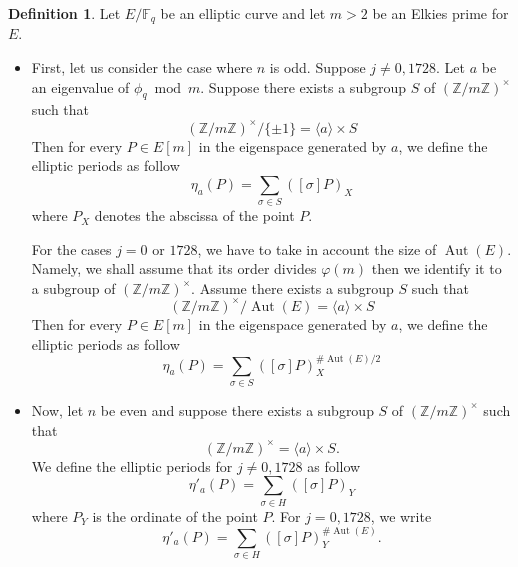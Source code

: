 \documentclass[12pt]{article}
\theoremstyle{plain}
\theoremstyle{definition}
\newtheorem{definition}[theorem]{Definition}
\DeclareMathOperator{\Aut}{Aut}
\def\Z{\ensuremath{\mathbb{Z}}}
\def\F{\ensuremath{\mathbb{F}}}
\begin{document}
\begin{definition}
\label{definition:ellperiod}
Let $E/\F_q$ be an elliptic curve and let $m>2$ be an Elkies prime for $E$.
\begin{itemize}
\item First, let us consider the case where $n$ is odd. Suppose $j\neq0, 1728$. Let 
$a$ be an eigenvalue of $\phi_q \bmod m$. Suppose there exists a subgroup $S$ of
$(\Z/m\Z)^{\times}$ such that 
\begin{equation}
(\Z/m\Z)^{\times}/\lbrace{\pm1}\rbrace = \langle{a}\rangle \times S
\end{equation}
Then for every $P\in E[m]$ in the eigenspace generated by $a$, we define
the elliptic periods as follow
\begin{equation}
\eta_{a}(P) = \sum_{\sigma\in S}{\left([\sigma]P\right)_X}
\end{equation}
where $P_X$ denotes the abscissa of the point $P$.\par
For the cases $j = 0$ or $1728$, we have to take in account the size
of $\Aut(E)$. Namely, we shall assume that its order divides $\varphi(m)$
then we identify it to a subgroup of $(\Z/m\Z)^{\times}$. Assume there exists a
subgroup $S$ such that
\begin{equation}
(\Z/m\Z)^{\times}/\Aut(E) = \langle{a}\rangle\times S
\end{equation}
Then for every $P\in E[m]$ in the eigenspace generated by $a$, we define
the elliptic periods as follow
\begin{equation}
\eta_{a}(P) = \sum_{\sigma\in
S}{\left([\sigma]P\right)_X^{\#\Aut(E)/2}}
\end{equation}\par

\item Now, let $n$ be even and suppose there exists a subgroup $S$ of $(\Z/m\Z)^{\times}$
such that
\begin{equation}
(\Z/m\Z)^{\times} = \langle{a}\rangle\times S.
\end{equation}
We define the elliptic periods for $j\neq0,1728$ as follow 
\begin{equation}
\eta'_a(P) = \sum_{\sigma\in H}{([\sigma]P)_Y}
\end{equation}
where $P_Y$ is the ordinate of the point $P$. For $j = 0,1728$, we write 
\begin{equation}
\eta'_a(P) = \sum_{\sigma\in H}{([\sigma]P)_Y^{\#\Aut(E)}}.
\end{equation}
\end{itemize}
\end{definition}
\end{document}
